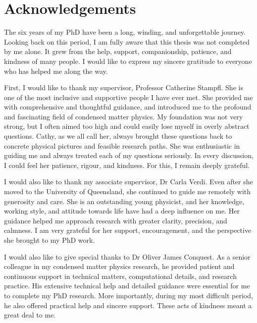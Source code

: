 \chapter*{Acknowledgements}


The six years of my PhD have been a long, winding, and unforgettable journey.
Looking back on this period, I am fully aware that this thesis was not completed by me alone.
It grew from the help, support, companionship, patience, and kindness of many people.
I would like to express my sincere gratitude to everyone who has helped me along the way.


First, I would like to thank my supervisor, Professor Catherine Stampfl.
She is one of the most inclusive and supportive people I have ever met.
She provided me with comprehensive and thoughtful guidance,
and introduced me to the profound and fascinating field of condensed matter physics.
My foundation was not very strong, but I often aimed too high and could easily lose myself in overly abstract questions.
Cathy, as we all call her, always brought these questions back to concrete physical pictures and feasible research paths.
She was enthusiastic in guiding me and always treated each of my questions seriously.
In every discussion, I could feel her patience, rigour, and kindness.
For this, I remain deeply grateful.

I would also like to thank my associate supervisor, Dr Carla Verdi.
Even after she moved to the University of Queensland,
she continued to guide me remotely with generosity and care.
She is an outstanding young physicist,
and her knowledge, working style, and attitude towards life have had a deep influence on me.
Her guidance helped me approach research with greater clarity, precision, and calmness.
I am very grateful for her support, encouragement, and the perspective she brought to my PhD work.

I would also like to give special thanks to Dr Oliver James Conquest.
As a senior colleague in my condensed matter physics research,
he provided patient and continuous support in technical matters, computational details, and research practice.
His extensive technical help and detailed guidance were essential for me to complete my PhD research.
More importantly, during my most difficult period,
he also offered practical help and sincere support.
These acts of kindness meant a great deal to me.

